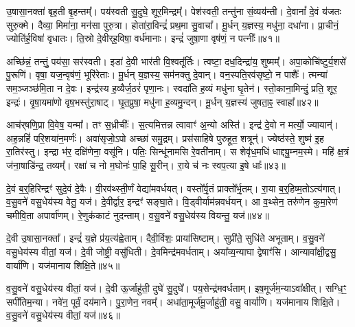 उ॒षासा॒नक्ता॑ बृह॒ती बृ॒हन्तम्᳚।
पय॑स्वती सु॒दुघे॒ शूर॒मिन्द्रम्᳚।
पेश॑स्वती॒ तन्तु॑ना सं॒व्यय॑न्ती।
दे॒वानां᳚ दे॒वं य॑जतः सुरु॒क्मे।
दैव्या॒ मिमा॑ना॒ मन॑सा पुरु॒त्रा।
होता॑रा॒विन्द्रं॑ प्रथ॒मा सु॒वाचा᳚।
मू॒र्धन् य॒ज्ञस्य॒ मधु॑ना॒ दधा॑ना।
प्रा॒चीनं॒ ज्योति॑र्ह॒विषा॑ वृधातः।
ति॒स्रो दे॒वीर्‌\mbox{}ह॒विषा॒ वर्ध॑मानाः।
इन्द्रं॑ जुषा॒णा वृष॑णं॒ न पत्नीः᳚॥४१॥\ip

अच्छि॑न्नं॒ तन्तुं॒ पय॑सा॒ सर॑स्वती।
इडा॑ दे॒वी भार॑ती वि॒श्वतू᳚र्तिः।
त्वष्टा॒ दध॒दिन्द्रा॑य॒ शुष्मम्᳚।
अपा॒कोचि॑ष्टुर्य॒शसे॑ पु॒रूणि॑।
वृषा॒ यज॒न्वृष॑णं॒ भूरि॑रेताः।
मू॒र्धन् य॒ज्ञस्य॒ सम॑नक्तु दे॒वान्।
वन॒स्पति॒रव॑सृष्टो॒ न पाशैः᳚।
त्मन्या॑ सम॒ञ्जञ्छ॑मि॒ता न दे॒वः।
इन्द्र॑स्य ह॒व्यैर्ज॒ठरं॑ पृणा॒नः।
स्वदा॑ति ह॒व्यं मधु॑ना घृ॒तेन॑।
स्तो॒काना॒मिन्दुं॒ प्रति॒ शूर॒ इन्द्रः॑।
वृ॒षा॒यमा॑णो वृष॒भस्तु॑रा॒षाट्।
घृ॒त॒प्रुषा॒ मधु॑ना ह॒व्यमु॒न्दन्।
मू॒र्धन् य॒ज्ञस्य॑ जुषता॒ꣴ॒ स्वाहा᳚॥४२॥\ip\anuvakamend[शर्ध॑मानो॒ महो॑भिः॒ पत्नी᳚र्घृ॒तेन॑ च॒त्वारि॑ च]

आच॑र्‌\mbox{}षणि॒प्रा वि॒वेष॒ यन्मा᳚।
तꣳ स॒ध्रीचीः᳚।
स॒त्यमित्तन्न त्वावाꣳ॑ अ॒न्यो अस्ति॑।
इन्द्र॑ दे॒वो न मर्त्यो॒ ज्यायान्॑।
अह॒न्नहिं॑ परि॒शया॑न॒मर्णः॑।
अवा॑सृजो॒ऽपो अच्छा॑ समु॒द्रम्।
प्रस॑साहिषे पुरुहूत॒ शत्रून्॑।
ज्येष्ठ॑स्ते॒ शुष्म॑ इ॒ह रा॒तिर॑स्तु।
इन्द्रा भ॑र॒ दक्षि॑णेना॒ वसू॑नि।
पतिः॒ सिन्धू॑नामसि रे॒वती॑नाम्।
स शेवृ॑ध॒मधि॑ धाद्द्यु॒म्नम॒स्मे।
महि॑ क्ष॒त्रं ज॑ना॒षाडि॑न्द्र॒ तव्यम्᳚।
रक्षा॑ च नो म॒घोनः॑ पा॒हि सू॒रीन्।
रा॒ये च॑ नः स्वप॒त्या इ॒षे धाः᳚॥४३॥\ip\anuvakamend[रे॒वती॑नां च॒त्वारि॑ च]

दे॒वं ब॒र्॒हिरिन्द्रꣳ॑ सुदे॒वं दे॒वैः।
वी॒रव॑थ्स्ती॒र्णं वेद्या॑मवर्धयत्।
वस्तो᳚र्वृ॒तं प्राक्तो᳚र्भृ॒तम्।
रा॒या ब॒र्॒हिष्म॒तो\-ऽत्य॑गात्।
व॒सु॒वने॑ वसु॒धेय॑स्य वेतु॒ यज॑।
दे॒वीर्द्वार॒ इन्द्रꣳ॑ सङ्घा॒ते।
वि॒ड्वीर्याम॑न्नवर्धयन्।
आ व॒थ्सेन॒ तरु॑णेन कुमा॒रेण॑ चमीवि॒ता अपार्वा॑णम्।
रे॒णुक॑काटं नुदन्ताम्।
व॒सु॒वने॑ वसु॒धेय॑स्य वियन्तु॒ यज॑॥४४॥\ip

दे॒वी उ॒षासा॒नक्ता᳚।
इन्द्रं॑ य॒ज्ञे प्र॑य॒त्य॑ह्वेताम्।
दैवी॒र्विशः॒ प्राया॑सिष्टाम्।
सुप्री॑ते॒ सुधि॑ते अभूताम्।
व॒सु॒वने॑ वसु॒धेय॑स्य वीतां॒ यज॑।
दे॒वी जोष्ट्री॒ वसु॑धिती।
दे॒वमिन्द्र॑मवर्धताम्।
अया᳚व्य॒न्याघा द्वेषाꣳ॑सि।
आन्यावा᳚क्षी॒द्वसु॒ वार्या॑णि।
यज॑मानाय शिक्षि॒ते॥४५॥\ip

व॒सु॒वने॑ वसु॒धेय॑स्य वीतां॒ यज॑।
दे॒वी ऊ॒र्जाहु॑ती॒ दुघे॑ सु॒दुघे᳚।
पय॒सेन्द्र॑मवर्धताम्।
इष॒मूर्ज॑म॒न्या\-ऽवा᳚क्षीत्।
सग्धि॒ꣳ॒ सपी॑तिम॒न्या।
नवे॑न॒ पूर्वं॒ दय॑माने।
पु॒रा॒णेन॒ नवम्᳚।
अधा॑ता॒मूर्ज॑मू॒र्जाहु॑ती॒ वसु॒ वार्या॑णि।
यज॑मानाय शिक्षि॒ते।
व॒सु॒वने॑ वसु॒धेय॑स्य वीतां॒ यज॑॥४६॥\ip

